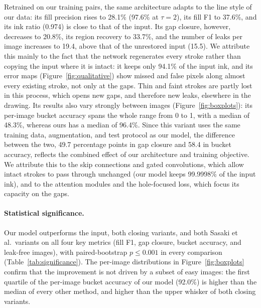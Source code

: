 \documentclass[preprint,12pt]{elsarticle}
\begin{document}
Retrained on our training pairs, the same architecture adapts to the line style of
our data: its fill precision rises to 28.1\% (97.6\% at $\tau=2$), its fill F1 to
37.6\%, and its ink ratio (0.974) is close to that of the input. Its gap closure,
however, decreases to 20.8\%, its region recovery to 33.7\%, and the number of leaks
per image increases to 19.4, above that of the unrestored input (15.5). We attribute
this mainly to the fact that the network regenerates every stroke rather than copying
the input where it is intact: it keeps only 94.1\% of the input ink, and its error
maps (Figure~\ref{fig:qualitative}) show missed and false pixels along almost every
existing stroke, not only at the gaps. Thin and faint strokes are partly lost in this
process, which opens new gaps, and therefore new leaks, elsewhere in the drawing. Its
results also vary strongly between images (Figure~\ref{fig:boxplots}): its per-image
bucket accuracy spans the whole range from 0 to 1, with a median of 48.3\%, whereas
ours has a median of 96.4\%. Since this variant uses the same training data,
augmentation, and test protocol as our model, the difference between the two, 49.7
percentage points in gap closure and 58.4 in bucket accuracy, reflects the combined
effect of our architecture and training objective. We attribute this to the skip connections and gated convolutions, which allow intact strokes to pass through unchanged (our model keeps 99.9998\% of the input ink), and to the attention modules and the hole-focused loss, which focus its capacity on the gaps.

\paragraph{Statistical significance.} Our model outperforms the input, both closing
variants, and both Sasaki et al.\ variants on all four key metrics (fill F1, gap
closure, bucket accuracy, and leak-free images), with paired-bootstrap $p \le 0.001$ in
every comparison (Table~\ref{tab:significance}). The per-image distributions in
Figure~\ref{fig:boxplots} confirm that the improvement is not driven by a subset of
easy images: the first quartile of the per-image bucket accuracy of our model
(92.0\%) is higher than the median of every other method, and higher than the upper
whisker of both closing variants.
\end{document}
